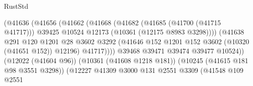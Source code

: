 \begin{lexlean}{RustStd}
\begin{coremodule}
                                                (@41636
                                                  (@41656
                                                    (@41662
                                                      (@41668
                                                        (@41682
                                                          (@41685 (@41700 (@41715 @41717)))
                                                          @39425
                                                          @10524
                                                          @12173
                                                          (@10361 (@12175 @8983 @3298))))
                                                      (@41638
                                                        @291
                                                        @120
                                                        @1201
                                                        @28
                                                        @3602
                                                        @3292
                                                        (@41646
                                                          @152
                                                          @1201
                                                          @152
                                                          @3602
                                                          (@10320 (@41651 @152))
                                                          @12196)
                                                        @41717))))
                                                @39468
                                                @39471
                                                @39474
                                                @39477
                                                @10524))
                                            (@12022 (@41604 @96))
                                            (@10361 (@41608 @1218 @181))
                                            (@10245 (@41615 @181 @98 @3551 @3298))
                                            (@12227
                                              @41309
                                              @3000
                                              @131
                                              @2551
                                              @3309
                                              (@41548
                                                @109
                                                @2551

\end{coremodule}
\end{lexlean}

